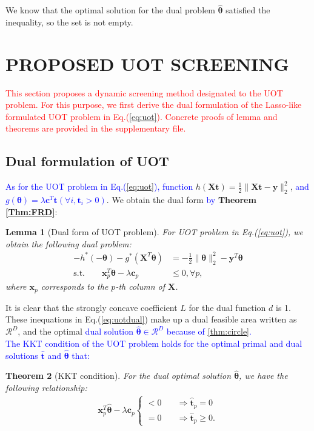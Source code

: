 \documentclass[twoside]{article}
\theoremstyle{plain}
\newtheorem{thm}{Theorem}
\newtheorem{lem}[thm]{Lemma}
\newcommand{\tranT}{T}
\newcommand{\mat}[1]{\mathbf{#1}}
\renewcommand{\vec}[1]{\bm{#1}}
\newcommand{\changeHK}[1]{\textcolor{red}{#1}}
\newcommand{\changeXS}[1]{\textcolor{blue}{#1}}
\begin{document}
We know that the optimal solution for the dual problem $\hat{\vec{\theta}}$ satisfied the inequality, so the set is not empty.


\section{PROPOSED UOT SCREENING}
\label{sec:pro}

\changeHK{This section proposes a dynamic screening method designated to the UOT problem. For this purpose, we first derive the dual formulation of the Lasso-like formulated UOT problem in Eq.(\ref{eq:uot}). Concrete proofs of lemma and theorems are provided in the supplementary file.}


\subsection{Dual formulation of UOT}

\changeXS{As for the UOT problem in Eq.(\ref{eq:uot}), function } 
 $h(\mat{X} \vec{t}) = \frac{1}{2}\|\mat{X} \vec{t}-\vec{y}\|_2^2$, \changeXS{and $g(\vec{\theta})=\lambda \vec{c}^{T}\vec{t} ( \forall i, \vec{t}_i>0)$}. We obtain the dual form \changeXS{by} {\bf Theorem \ref{Thm:FRD}}:
\begin{lem}[Dual form of UOT problem]
For UOT problem in Eq.(\ref{eq:uot}), we obtain the following dual problem:
\begin{equation}
\begin{split}
-h^*(-\vec{\theta}) - g^*(\mat{X}^{\tranT}\vec{\theta})& = -\frac{1}{2}\|\vec{\theta}\|_2^2-\vec{y}^{\tranT}\vec{\theta} \\
 \text{s.t.} \quad \quad \vec{x}_p^{\tranT}\vec{\theta} -\lambda \vec{c}_p &\leq 0, \forall p,
 \end{split}
 \label{eq:uotdual}
\end{equation}
where $\vec{x}_p $ corresponds to the $p$-th column of $\mat{X}$. 
\end{lem}
It is clear that the strongly concave coefficient $L$ for the dual function $d$ is 1. These inequations in Eq.(\ref{eq:uotdual}) make up a dual feasible area written as $\mathcal{R}^{D}$, and the optimal \changeXS{dual solution $\hat{\vec{\theta}} \in \mathcal{R}^{D}$ because of \ref{thm:circle}.}\\
\changeXS{The KKT condition of the UOT problem holds for the optimal primal and dual solutions $ \hat{\vec{t}}$ and $\hat{\vec{\theta}}$ that:}
\begin{thm}[KKT condition] For the dual optimal solution $\hat{\vec{\theta}}$, we have the following relationship:
 \begin{equation}
\begin{split}
\vec{x}_p^{\tranT}\hat{\vec{\theta}} -\lambda \vec{c}_p \left\{
\begin{aligned}
< 0 \quad& \Rightarrow \hat{\vec{t}}_p = 0\\
= 0 \quad& \Rightarrow \hat{\vec{t}}_p \geq 0.
\end{aligned}
\right.
 \end{split}
 \label{eq:kkt}
\end{equation}
\end{thm}
\end{document}

